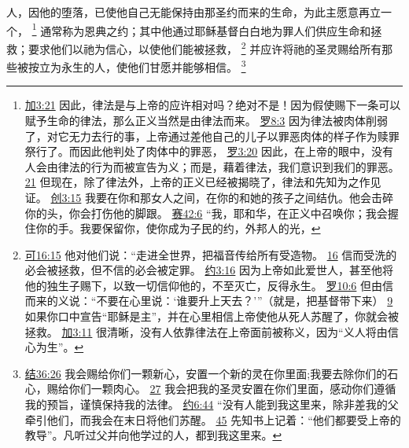 \documentclass[12pt, a4paper, oneside]{ctexart}
\newcounter{parnum}[section]
\newcommand{\N}{%
   \noindent\refstepcounter{parnum}%
    \makebox[\parindent][l]{\textbf{\arabic{parnum}.}}}
\begin{document}
\N 人，因他的堕落，已使他自己无能保持由那圣约而来的生命，为此主愿意再立一个，
	\footnote {
		\href{https://biblehub.com/galatians/3-21.htm}{加3:21} 因此，律法是与上帝的应许相对吗？绝对不是！因为假使赐下一条可以赋予生命的律法，那么正义当然是由律法而来。
		\href{https://biblehub.com/romans/8-3.htm}{罗8:3} 因为律法被肉体削弱了，对它无力去行的事，上帝通过差他自己的儿子以罪恶肉体的样子作为赎罪祭行了。而因此他判处了肉体中的罪恶，
		\href{https://biblehub.com/romans/3-20.htm}{罗3:20} 因此，在上帝的眼中，没有人会由律法的行为而被宣告为义；而是，藉着律法，我们意识到我们的罪恶。
		\href{https://biblehub.com/romans/3-21.htm}{21} 但现在，除了律法外，上帝的正义已经被揭晓了，律法和先知为之作见证。
		\href{https://biblehub.com/genesis/3-15.htm}{创3:15} 我要在你和那女人之间，在你的和她的孩子之间结仇。他会击碎你的头，你会打伤他的脚跟。
		\href{https://biblehub.com/isaiah/42-6.htm}{赛42:6} “我，耶和华，在正义中召唤你；我会握住你的手。我要保留你，使你成为子民的约，外邦人的光，
	}
	通常称为恩典之约；其中他通过耶稣基督白白地为罪人们供应生命和拯救；要求他们以祂为信心，以使他们能被拯救，
	\footnote {
		\href{https://biblehub.com/mark/16-15.htm}{可16:15} 他对他们说：“走进全世界，把福音传给所有受造物。
		\href{https://biblehub.com/mark/16-16.htm}{16} 信而受洗的必会被拯救，但不信的必会被定罪。
		\href{https://biblehub.com/john/3-16.htm}{约3:16} 因为上帝如此爱世人，甚至他将他的独生子赐下，以致一切信仰他的，不至灭亡，反得永生。
		\href{https://biblehub.com/romans/10-6.htm}{罗10:6} 但由信而来的义说：“不要在心里说：‘谁要升上天去？’”（就是，把基督带下来）
		\href{https://biblehub.com/romans/10-9.htm}{9} 如果你口中宣告“耶稣是主”，并在心里相信上帝使他从死人苏醒了，你就会被拯救。
		\href{https://biblehub.com/galatians/3-11.htm}{加3:11} 很清晰，没有人依靠律法在上帝面前被称义，因为“义人将由信心为生”。
	}
	并应许将祂的圣灵赐给所有那些被按立为永生的人，使他们甘愿并能够相信。
	\footnote {
		\href{https://biblehub.com/ezekiel/36-26.htm}{结36:26} 我会赐给你们一颗新心，安置一个新的灵在你里面;我要去除你们的石心，赐给你们一颗肉心。
		\href{https://biblehub.com/ezekiel/36-27.htm}{27} 我会把我的圣灵安置在你们里面，感动你们遵循我的预旨，谨慎保持我的法律。
		\href{https://biblehub.com/john/6-44.htm}{约6:44} “没有人能到我这里来，除非差我的父牵引他们，而我会在末日将他们苏醒。
		\href{https://biblehub.com/john/6-45.htm}{45} 先知书上记着：“他们都要受上帝的教导”。凡听过父并向他学过的人，都到我这里来。
	}
\end{document}
